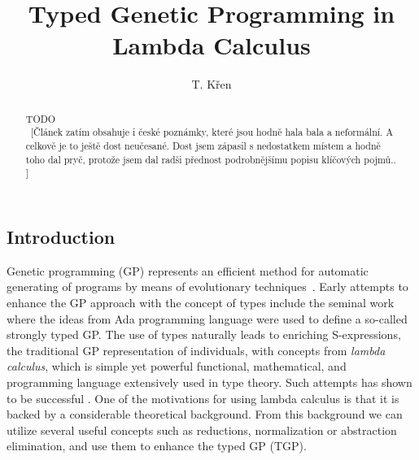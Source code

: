 \documentclass[11pt]{article}
\newcommand{\red}[1]{{\color{red} #1}}
\begin{document}
\setlength{\pdfpagewidth}{210mm}
\setlength{\pdfpageheight}{297mm}


\title{Typed Genetic Programming in Lambda Calculus}

\author{T. K\v ren}



\begin{abstract}
\red{TODO\\~[Článek zatím obsahuje i české poznámky, které jsou hodně hala bala a neformální. A celkově je to ještě dost neučesané. Dost jsem zápasil s nedostatkem místem a hodně toho dal pryč, protože jsem dal radši přednost podrobnějšímu popisu klíčových pojmů.. ]}
\end{abstract}

\begin{article}

\section{Introduction}


Genetic programming (GP) represents an efficient method for automatic generating of programs by means of evolutionary techniques~\citep{koza92,koza2003genetic}. Early attempts to enhance the GP approach with the concept of types include the seminal work~\citep{montana95} where the ideas from Ada programming language were used to define a so-called strongly typed GP.   
The use of types naturally leads to enriching S-expressions,
the traditional GP representation of individuals, with concepts from
\textit{lambda calculus}, which is simple yet powerful functional, mathematical, and programming 
language extensively used in type theory. Such attempts has shown to be 
successful \cite{yu01}. 
One of the motivations for using lambda calculus is that it is backed by a considerable theoretical background. From this background we can utilize several useful concepts such as reductions, normalization or abstraction elimination, and use them to enhance the typed GP (TGP).




\end{article}
\end{document}
